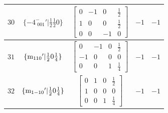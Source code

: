 \documentclass[fleqn,8pt]{jsarticle}
\begin{document}
\begin{longtable}{ccccc}
$ 30 $ & $ \{-4^{-}_{\,\,001}{}'|\frac{1}{2} \frac{1}{2} 0\} $ & $ \begin{bmatrix} 0 & -1 & 0 & \frac{1}{2} \\ 1 & 0 & 0 & \frac{1}{2} \\ 0 & 0 & -1 & 0 \end{bmatrix} $ & $ -1 $ & $ -1 $ \\ \hline
$ 31 $ & $ \{{\rm m}_{110}{}'|\frac{1}{2} 0 \frac{1}{4}\} $ & $ \begin{bmatrix} 0 & -1 & 0 & \frac{1}{2} \\ -1 & 0 & 0 & 0 \\ 0 & 0 & 1 & \frac{1}{4} \end{bmatrix} $ & $ -1 $ & $ -1 $ \\ \hline
$ 32 $ & $ \{{\rm m}_{1-10}{}'|\frac{1}{2} 0 \frac{1}{4}\} $ & $ \begin{bmatrix} 0 & 1 & 0 & \frac{1}{2} \\ 1 & 0 & 0 & 0 \\ 0 & 0 & 1 & \frac{1}{4} \end{bmatrix} $ & $ -1 $ & $ -1 $ \\
\end{longtable}
\end{document}
